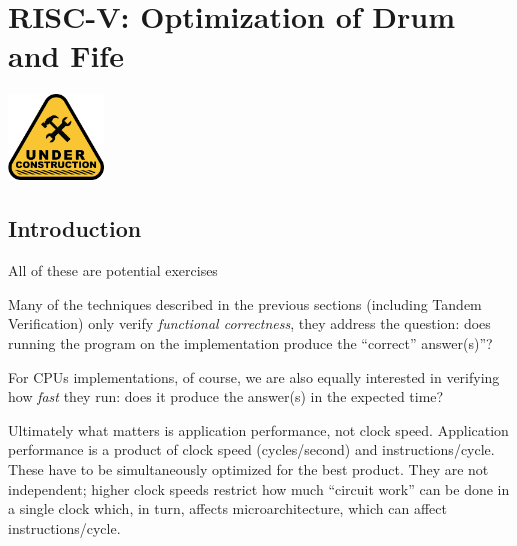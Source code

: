 

\chapter{RISC-V: Optimization of Drum and Fife}


\setcounter{page}{1}
\renewcommand{\thepage}{\arabic{chapter}-\arabic{page}}

\label{ch_Optimization}


\vspace{2ex}

\centerline{\includegraphics[width=1in,angle=0]{Figures/Fig_Under_Construction}}

\vspace{2ex}


\section{Introduction}

All of these are potential exercises

Many of the techniques described in the previous sections (including
Tandem Verification) only verify \emph{functional correctness}, {\ie}
they address the question: does running the program on the
implementation produce the ``correct'' answer(s)''?

For CPUs implementations, of course, we are also equally interested in
verifying how \emph{fast} they run: does it produce the answer(s) in
the expected time?

Ultimately what matters is application performance, not clock speed.
Application performance is a product of clock speed (cycles/second)
and instructions/cycle.  These have to be simultaneously optimized for
the best product.  They are not independent; higher clock speeds
restrict how much ``circuit work'' can be done in a single clock
which, in turn, affects microarchitecture, which can affect
instructions/cycle.

